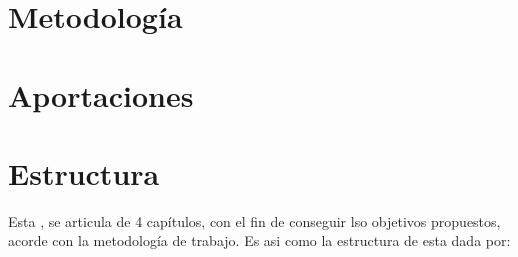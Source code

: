%
%

\section{Metodología}


\section{Aportaciones}

\section{Estructura}

Esta \nombreDoc, se  articula de 4 capítulos, con el fin de conseguir lso
objetivos propuestos, acorde con la metodología de trabajo. Es asi como la
estructura de \nombreDoc esta dada por:


